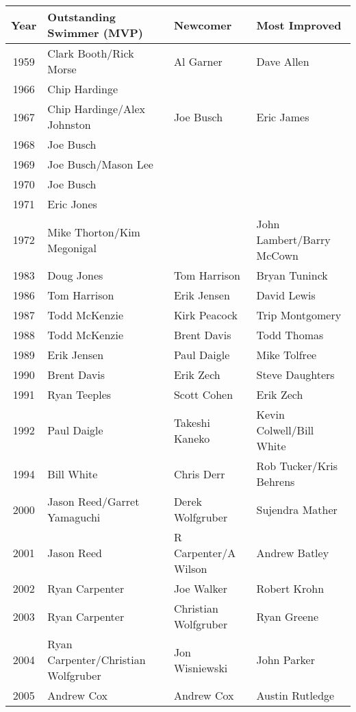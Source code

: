     \begin{table}[htbp]
        \centering
        \scriptsize
        \begin{tabular}{clll}
        \toprule
        Year & Outstanding Swimmer (MVP) & Newcomer & Most Improved \\
        \midrule
        1959 & Clark Booth/Rick Morse & Al Garner & Dave Allen \\
        1966 & Chip Hardinge &  &  \\
        1967 & Chip Hardinge/Alex Johnston & Joe Busch & Eric James \\
        1968 & Joe Busch &  &  \\
        1969 & Joe Busch/Mason Lee &  &  \\
        1970 & Joe Busch &  &  \\
        1971 & Eric Jones &  &  \\
        1972 & Mike Thorton/Kim Megonigal &  & John Lambert/Barry McCown \\
        1983 & Doug Jones & Tom Harrison & Bryan Tuninck \\
        1986 & Tom Harrison & Erik Jensen & David Lewis \\
        1987 & Todd McKenzie & Kirk Peacock & Trip Montgomery \\
        1988 & Todd McKenzie & Brent Davis & Todd Thomas \\
        1989 & Erik Jensen & Paul Daigle & Mike Tolfree \\
        1990 & Brent Davis & Erik Zech & Steve Daughters \\
        1991 & Ryan Teeples & Scott Cohen & Erik Zech \\
        1992 & Paul Daigle & Takeshi Kaneko & Kevin Colwell/Bill White \\
        1994 & Bill White & Chris Derr & Rob Tucker/Kris Behrens \\
        2000 & Jason Reed/Garret Yamaguchi & Derek Wolfgruber & Sujendra Mather \\
        2001 & Jason Reed & R Carpenter/A Wilson & Andrew Batley \\
        2002 & Ryan Carpenter & Joe Walker & Robert Krohn \\
        2003 & Ryan Carpenter & Christian Wolfgruber & Ryan Greene \\
        2004 & Ryan Carpenter/Christian Wolfgruber & Jon Wisniewski & John Parker \\
        2005 & Andrew Cox & Andrew Cox & Austin Rutledge \\

\end{tabular}
\end{table}
